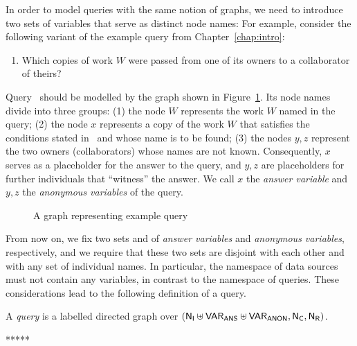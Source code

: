 In order to model queries with the same notion of graphs, we need to introduce
two sets of variables that serve as distinct node names:
For example, consider the following variant of the example query  from Chapter~\ref{chap:intro}:
%
\begin{enumerate}
  \item[\exaquery{2$'$}]
    Which copies of work $W$ were passed from one of its owners to a collaborator of theirs?
\end{enumerate}
%
Query~
should be modelled by the graph shown in Figure~\ref{fig:graph_for_exa_query2'}.
Its node names divide into three groups:
(1) the node $W$ represents the work $W$ named in the query;
(2) the node $x$ represents a copy of the work $W$ that satisfies the conditions stated in~ and
whose name is to be found;
(3) the nodes $y,z$ represent the two owners (collaborators) whose names are not known.
Consequently, $x$ serves as a placeholder for the answer to the query,
and $y,z$ are placeholders for further individuals that ``witness'' the answer.
We call $x$ the \emph{answer variable} and $y,z$ the \emph{anonymous variables}
of the query.

\begin{figure}
  \caption{A graph representing example query }
  \label{fig:graph_for_exa_query2'}
\end{figure}

From now on, we fix two sets \VARANS and \VARANON
of \emph{answer variables} and \emph{anonymous variables}, respectively,
and we require that these two sets are disjoint with each other
and with any set \NI of individual names.
In particular, the namespace of data sources must not contain any variables,
in contrast to the namespace of queries.
These considerations lead to the following definition of a query.

\begin{definition}
  A \emph{query} is a labelled directed graph
  over $(\mathsf{N}_\mathsf{I} \uplus \mathsf{VAR}_\mathsf{ANS} \uplus \mathsf{VAR}_\mathsf{ANON}, \mathsf{N}_\mathsf{C}, \mathsf{N}_\mathsf{R})$.
\end{definition}



*****


